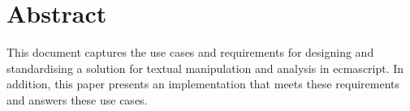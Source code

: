 
\begingroup
\let\clearpage\relax
\let\cleardoublepage\relax
\let\cleardoublepage\relax

\chapter*{Abstract}

This document captures the use cases and requirements for designing and
standardising a solution for textual manipulation and analysis in
\gls{ecmascript}. In addition, this paper presents an implementation that
meets these requirements and answers these use cases.

\endgroup

